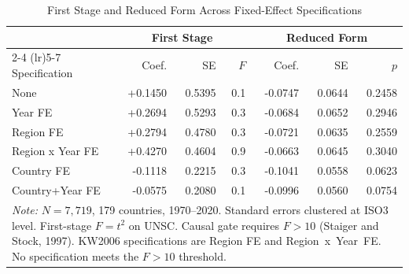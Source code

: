 \begin{table}[htbp]
\centering
\caption{First Stage and Reduced Form Across Fixed-Effect Specifications}
\label{tab:fs_rf}
\begin{tabular}{lrrrrrr}
\toprule
& \multicolumn{3}{c}{\textbf{First Stage}} & \multicolumn{3}{c}{\textbf{Reduced Form}} \\
\cmidrule(lr){2-4} \cmidrule(lr){5-7}
Specification & Coef. & SE & $F$ & Coef. & SE & $p$ \\
\midrule
  None                 & +0.1450 & 0.5395 & 0.1 & -0.0747 & 0.0644 & 0.2458 \\
  Year FE              & +0.2694 & 0.5293 & 0.3 & -0.0684 & 0.0652 & 0.2946 \\
  Region FE            & +0.2794 & 0.4780 & 0.3 & -0.0721 & 0.0635 & 0.2559 \\
  Region x Year FE     & +0.4270 & 0.4604 & 0.9 & -0.0663 & 0.0645 & 0.3040 \\
  Country FE           & -0.1118 & 0.2215 & 0.3 & -0.1041 & 0.0558 & 0.0623 \\
  Country+Year FE      & -0.0575 & 0.2080 & 0.1 & -0.0996 & 0.0560 & 0.0754 \\
\midrule
\multicolumn{7}{p{0.85\textwidth}}{\footnotesize\textit{Note:} $N=7,719$, 179 countries, 1970--2020. Standard errors clustered at ISO3 level. First-stage $F=t^2$ on UNSC. Causal gate requires $F>10$ (Staiger and Stock, 1997). KW2006 specifications are Region FE and Region~x~Year~FE. No specification meets the $F>10$ threshold.}\\
\end{tabular}
\end{table}
